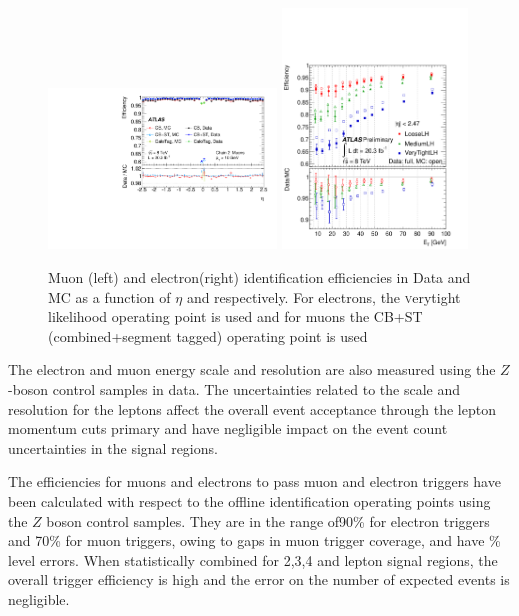 \begin{figure}[htbp]
\begin{center}
\includegraphics[width=0.54\textwidth]{figs/systematics/fig_18a}
\includegraphics[width=0.44\textwidth]{figs/systematics/fig_22a}
\caption{Muon (left) and electron(right) identification efficiencies in Data and MC as a function of $\eta$ and \pt respectively. For electrons, the {\textsc verytight} likelihood operating point is used and for muons the CB+ST (combined+segment tagged) operating point is used}
\label{figure:systematics_lepidsf}
\end{center}
\end{figure}

The electron\cite{EgammaReco} and muon\cite{MuonSF} energy scale and resolution are also measured using the $Z$-boson control samples in data. The uncertainties related to the scale and resolution for the leptons affect the overall event acceptance through the lepton momentum cuts primary and have negligible impact on the event count uncertainties in the signal regions.

The efficiencies for muons and electrons to pass muon\cite{ATLAS-CONF-2012-099} and electron triggers\cite{ATLAS-CONF-2012-048} have been calculated with respect to the offline identification operating points using the $Z$ boson control samples. They are in the range of90\% for electron triggers and 70\% for muon triggers, owing to gaps in muon trigger coverage, and have \% level errors. When statistically combined for 2,3,4 and lepton signal regions, the overall trigger efficiency is high and the error on the number of expected events is negligible. 


